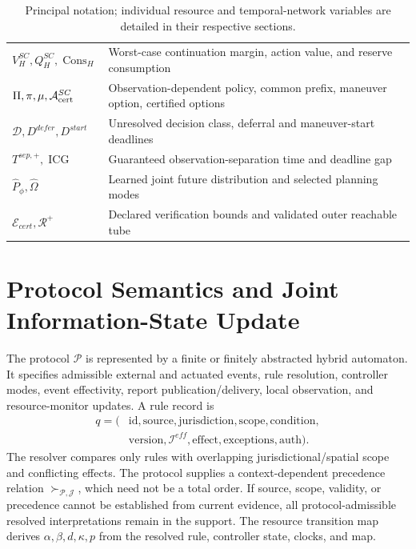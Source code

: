 \documentclass[letterpaper]{article} %
\begin{document}
\begin{table}[t]
\begin{tabular}{@{}p{}p{}@{}}
$V_H^{SC},Q_H^{SC},\operatorname{Cons}_H$ & Worst-case continuation margin, action value, and reserve consumption\\
$\Pi,\pi,\mu,\mathcal A_{\rm cert}^{SC}$ & Observation-dependent policy, common prefix, maneuver option, certified options\\
$\mathcal D,D^{defer},D^{start}$ & Unresolved decision class, deferral and maneuver-start deadlines\\
$T^{sep,+},\operatorname{ICG}$ & Guaranteed observation-separation time and deadline gap\\
$\widehat P_\phi,\widehat\Omega$ & Learned joint future distribution and selected planning modes\\
$\mathcal E_{cert},\mathcal R^+$ & Declared verification bounds and validated outer reachable tube\\
\bottomrule
\end{tabular}
\caption{Principal notation; individual resource and temporal-network variables are detailed in their respective sections.}
\label{tab:notation}
\end{table}

\section{Protocol Semantics and Joint Information-State Update}
\label{app:protocol}
The protocol $\mathcal P$ is represented by a finite or finitely abstracted hybrid automaton. It specifies admissible external and actuated events, rule resolution, controller modes, event effectivity, report publication/delivery, local observation, and resource-monitor updates. A rule record is
\begin{equation}
\begin{aligned}
q=(&\mathrm{id},\mathrm{source},\mathrm{jurisdiction},\mathrm{scope},\mathrm{condition},\\
&\mathrm{version},\mathcal I^{eff},\mathrm{effect},\mathrm{exceptions},\mathrm{auth}).
\end{aligned}
\label{eq:rule-record}
\end{equation}
The resolver compares only rules with overlapping jurisdictional/spatial scope and conflicting effects. The protocol supplies a context-dependent precedence relation $\succ_{\mathcal P,\mathcal J}$, which need not be a total order. If source, scope, validity, or precedence cannot be established from current evidence, all protocol-admissible resolved interpretations remain in the support. The resource transition map derives $\alpha,\beta,d,\kappa,p$ from the resolved rule, controller state, clocks, and map.
\end{document}
